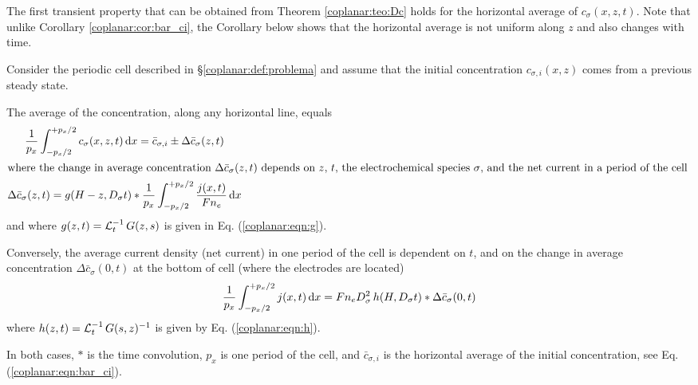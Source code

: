 The first transient property that can be obtained from Theorem \ref{coplanar:teo:Dc}
holds for the horizontal average of $c_{\sigma}(x,z,t)$.
Note that unlike Corollary \ref{coplanar:cor:bar_ci},
the Corollary below shows that the horizontal average is not uniform along $z$
and also changes with time.

\begin{corolario}
	\label{coplanar:cor:delta_bar_c}
	Consider the periodic cell described in \S\ref{coplanar:def:problema}
	and assume that the initial concentration $c_{\sigma,i}(x,z)$ comes from a previous steady state.

	The average of the concentration, along any horizontal line, equals
	\begin{subequations}
		\label{coplanar:eqn:bar_c}
		\begin{gather}
			\frac{1}{p_{x}}
			\int_{-p_{x}/2}^{+p_{x}/2} c_{\sigma}(x,z,t) \ud{x}
			= \bar{c}_{\sigma,i} \pm \Delta \bar{c}_{\sigma}(z,t)
			\\
			\intertext{%
				where the change in average concentration $\Delta\bar{c}_{\sigma}(z,t)$
				depends on $z$, $t$, the electrochemical species $\sigma$,
				and the net current in a period of the cell
			}
			\label{coplanar:eqn:delta_bar_c}
			\Delta \bar{c}_{\sigma}(z,t)
			= g(H-z, D_{\sigma}t) * \frac{1}{p_{x}}
			\int_{-p_{x}/2}^{+p_{x}/2} \frac{j(x,t)}{F n_{e}} \ud{x}
		\end{gather}
	\end{subequations}
	and where $g(z,t) = \operatorname{\mathcal{L}}_{t}^{-1} G(z,s)$ is given in Eq. (\ref{coplanar:eqn:g}).

	Conversely,
	the average current density (net current) in one period of the cell
	is dependent on $t$,
	and on the change in average concentration $\Delta\bar{c}_{\sigma}(0,t)$
	at the bottom of cell (where the electrodes are located)
	\begin{equation}
		\label{coplanar:eqn:i_net}
		\frac{1}{p_{x}} \int_{-p_{x}/2}^{+p_{x}/2} j(x,t) \,\mathrm{d}x
		= F n_{e} D_{\sigma}^{2}\, h(H, D_{\sigma} t) * \Delta\bar{c}_{\sigma} (0,t)
	\end{equation}
	where $h(z,t) = \operatorname{\mathcal{L}}_{t}^{-1} G(s,z)^{-1}$ is given by Eq. (\ref{coplanar:eqn:h}).

	In both cases, $*$ is the time convolution, $p_{x}$ is one period of the cell, and
	$\bar{c}_{\sigma,i}$ is the horizontal average of the initial concentration,
	see Eq. (\ref{coplanar:eqn:bar_ci}).
\end{corolario}

